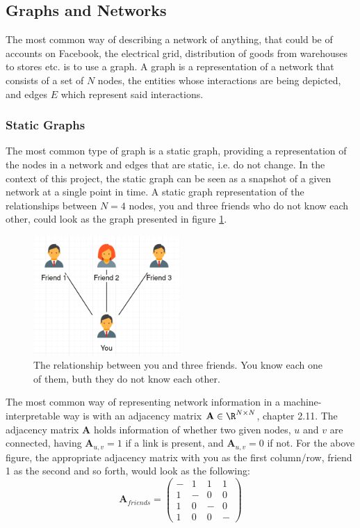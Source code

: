 \subsection{Graphs and Networks}
\label{sec:Method:Graphs}
The most common way of describing a network of anything, that could be of accounts on Facebook, the electrical grid, distribution of goods from warehouses to stores etc. is to use a graph.
A graph is a representation of a network that consists of a set of $N$ nodes, the entities whose interactions are being depicted, and edges $E$ which represent said interactions.


\subsubsection{Static Graphs}
\label{sec:Method:Graphs:StaticGraphs}
The most common type of graph is a static graph, providing a representation of the nodes in a network and edges that are static, i.e. do not change. 
In the context of this project, the static graph can be seen as a snapshot of a given network at a single point in time.
A static graph representation of the relationships between $N=4$ nodes, you and three friends who do not know each other, could look as the graph presented in figure \ref{fig:StaticGraph}.

\begin{figure}[H]
    \centering
    \includegraphics[width=0.5\textwidth]{0_images/static_graph.png}
    \caption{The relationship between you and three friends. You know each one of them, buth they do not know each other.}
    \label{fig:StaticGraph}
\end{figure}
\noindent
The most common way of representing network information in a machine-interpretable way is with an adjacency matrix $\textbf{A} \in \R^{N \times N}$, \cite{NetworkBarabasi} chapter 2.11.
The adjacency matrix $\textbf{A}$ holds information of whether two given nodes, $u$ and $v$ are connected, having $\textbf{A}_{u,v} = 1$ if a link is present, and $\textbf{A}_{u,v} = 0$ if not.
For the above figure, the appropriate adjacency matrix  with you as the first column/row, friend 1 as the second and so forth, would look as the following:
\begin{equation}
    \textbf{A}_{friends} = \begin{pmatrix}
                - & 1 & 1 & 1\\
                1 & - & 0 & 0\\
                1 & 0 & - & 0\\
                1 & 0 & 0 & -
                \end{pmatrix}
\end{equation}

